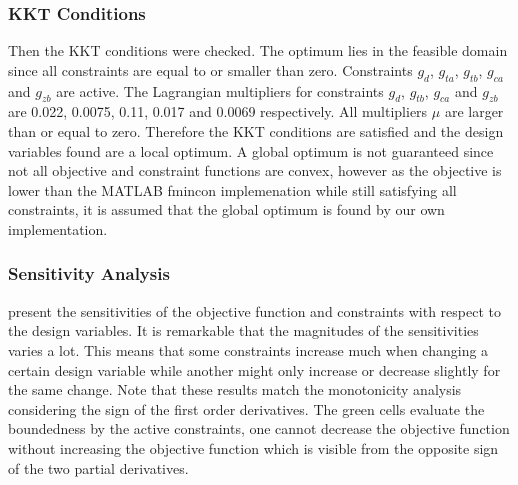 \subsubsection{KKT Conditions}
Then the KKT conditions were checked. 
The optimum lies in the feasible domain since all constraints are equal to or smaller than zero. Constraints $g_d$, $g_{ta}$, $g_{tb}$, $g_{ca}$ and $g_{zb}$ are active. The Lagrangian multipliers for constraints $g_d$, $g_{tb}$, $g_{ca}$ and $g_{zb}$ are 0.022, 0.0075, 0.11, 0.017 and 0.0069 respectively.  
All multipliers $\mu$ are larger than or equal to zero. 
Therefore the KKT conditions are satisfied and the design variables found are a local optimum. 
A global optimum is not guaranteed since not all objective and constraint functions are convex, 
however as the objective is lower than the MATLAB fmincon implemenation while still satisfying all constraints, it is assumed that the global optimum is found by our own implementation.


\subsubsection{Sensitivity Analysis}

 present the sensitivities of the objective function and constraints with respect to the design variables. 
It is remarkable that the magnitudes of the sensitivities varies a lot. 
This means that some constraints increase much when changing a certain design variable while another might only increase or decrease slightly for the same change.  
Note that these results match the monotonicity analysis considering the sign of the first order derivatives. 
The green cells evaluate the boundedness by the active constraints, one cannot decrease the objective function without increasing the objective function which is visible from the opposite sign of the two partial derivatives.

